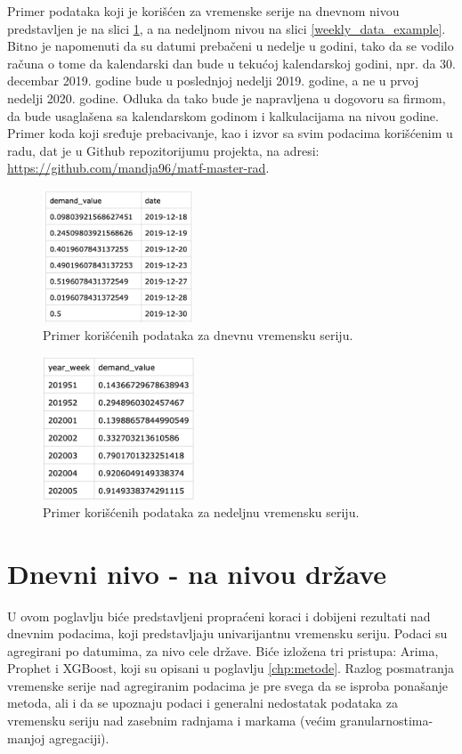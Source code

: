 \documentclass[12pt,oneside]{memoir}
\begin{document}
Primer podataka koji je korišćen za vremenske serije na dnevnom nivou predstavljen je na slici \ref{fig: daily_data_example}, a na nedeljnom nivou na slici \ref{weekly_data_example}. Bitno je napomenuti da su datumi prebačeni u nedelje u godini, tako da se vodilo računa o tome da kalendarski dan bude u tekućoj kalendarskoj godini, npr. da 30. decembar 2019. godine bude u poslednjoj nedelji 2019. godine, a ne u prvoj nedelji 2020. godine. Odluka da tako bude je napravljena u dogovoru sa firmom, da bude usaglašena sa kalendarskom godinom i kalkulacijama na nivou godine. Primer koda koji sređuje prebacivanje, kao i izvor sa svim podacima korišćenim u radu, dat je u Github repozitorijumu projekta, na adresi: \url{https://github.com/mandja96/matf-master-rad}.

\begin{figure}[!ht]
  \centering
  \includegraphics[width=0.4\textwidth]{./grafici/daily_data_example.png}
  \caption{Primer korišćenih podataka za dnevnu vremensku seriju.}
  \label{fig: daily_data_example}
\end{figure}

\begin{figure}[!ht]
  \centering
  \includegraphics[width=0.4\textwidth]{./grafici/weekly_data_example.png}
  \caption{Primer korišćenih podataka za nedeljnu vremensku seriju.}
  \label{fig: weekly_data_example}
\end{figure}

\section{Dnevni nivo - na nivou države} 
U ovom poglavlju biće predstavljeni propraćeni koraci i dobijeni rezultati nad dnevnim podacima, koji predstavljaju univarijantnu vremensku seriju. Podaci su agregirani po datumima, za nivo cele države. Biće izložena tri pristupa: Arima, Prophet i XGBoost, koji su opisani u poglavlju \ref{chp:metode}. Razlog posmatranja vremenske serije nad agregiranim podacima je pre svega da se isproba ponašanje metoda, ali i da se upoznaju podaci i generalni nedostatak podataka za vremensku seriju nad zasebnim radnjama i markama (većim granularnostima-manjoj agregaciji). 
\end{document}
